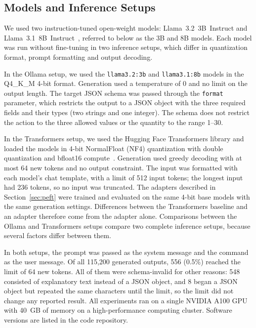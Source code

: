 \documentclass[journal,article,submit,pdftex,moreauthors]{Definitions/mdpi}
\begin{document}
\subsection{Models and Inference Setups}\label{sec:models}

We used two instruction-tuned open-weight models: Llama~3.2~3B~Instruct and Llama~3.1~8B~Instruct~\citep{grattafiori2024llama}, referred to below as the 3B and 8B models. Each model was run without fine-tuning in two inference setups, which differ in quantization format, prompt formatting and output decoding.

In the Ollama setup, we used the \texttt{llama3.2:3b} and \texttt{llama3.1:8b} models in the Q4\_K\_M 4-bit format. Generation used a temperature of 0 and no limit on the output length. The target JSON schema was passed through the \texttt{format} parameter, which restricts the output to a JSON object with the three required fields and their types (two strings and one integer). The schema does not restrict the action to the three allowed values or the quantity to the range 1--30.

In the Transformers setup, we used the Hugging Face Transformers library and loaded the models in 4-bit NormalFloat (NF4) quantization with double quantization and bfloat16 compute~\citep{dettmers2023qlora}. Generation used greedy decoding with at most 64 new tokens and no output constraint. The input was formatted with each model's chat template, with a limit of 512 input tokens; the longest input had 236 tokens, so no input was truncated. The adapters described in Section~\ref{sec:peft} were trained and evaluated on the same 4-bit base models with the same generation settings. Differences between the Transformers baseline and an adapter therefore come from the adapter alone. Comparisons between the Ollama and Transformers setups compare two complete inference setups, because several factors differ between them.

In both setups, the prompt was passed as the system message and the command as the user message. Of all 115,200 generated outputs, 556 (0.5\%) reached the limit of 64 new tokens. All of them were schema-invalid for other reasons: 548 consisted of explanatory text instead of a JSON object, and 8 began a JSON object but repeated the same characters until the limit, so the limit did not change any reported result. All experiments ran on a single NVIDIA A100 GPU with 40~GB of memory on a high-performance computing cluster. Software versions are listed in the code repository.
\end{document}
